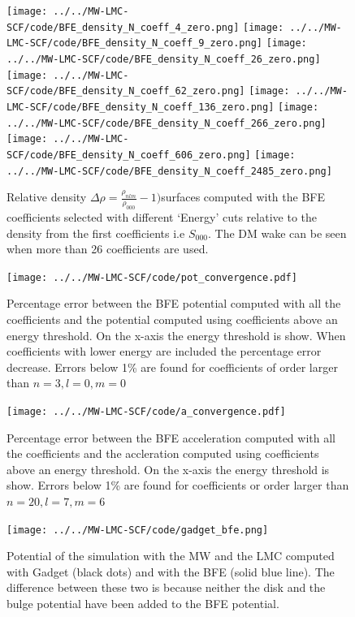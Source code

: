 \documentclass[14pt]{article}
\begin{document}
\begin{figure}[H]
  \centering
  \texttt{[image: ../../MW-LMC-SCF/code/BFE\_density\_N\_coeff\_4\_zero.png]}
  \texttt{[image: ../../MW-LMC-SCF/code/BFE\_density\_N\_coeff\_9\_zero.png]}
  \texttt{[image: ../../MW-LMC-SCF/code/BFE\_density\_N\_coeff\_26\_zero.png]}
  \texttt{[image: ../../MW-LMC-SCF/code/BFE\_density\_N\_coeff\_62\_zero.png]}
  \texttt{[image: ../../MW-LMC-SCF/code/BFE\_density\_N\_coeff\_136\_zero.png]}
  \texttt{[image: ../../MW-LMC-SCF/code/BFE\_density\_N\_coeff\_266\_zero.png]}
  \texttt{[image: ../../MW-LMC-SCF/code/BFE\_density\_N\_coeff\_606\_zero.png]}
  \texttt{[image: ../../MW-LMC-SCF/code/BFE\_density\_N\_coeff\_2485\_zero.png]}
  \caption{Relative density $\Delta \rho=\frac{\rho_{nlm}}{\rho_{000}}-1) $surfaces computed with the BFE coefficients selected with
  different `Energy' cuts relative to the density from the first coefficients
  i.e $S_{000}$. The DM wake can be seen when more than 26 coefficients are
  used.}
\end{figure}




\begin{figure}[H]
  \centering
  \texttt{[image: ../../MW-LMC-SCF/code/pot\_convergence.pdf]}
  \caption{Percentage error between the BFE potential computed with all the
  coefficients and the potential computed using coefficients above an energy
  threshold. On the x-axis the energy threshold is show. When coefficients with
  lower energy are included the percentage error decrease. Errors below 1\% are
  found for coefficients of order larger than $n=3, l=0, m=0$}
\end{figure}




\begin{figure}[H]
  \texttt{[image: ../../MW-LMC-SCF/code/a\_convergence.pdf]}
  \caption{Percentage error between the BFE acceleration computed with all the
  coefficients and the accleration computed using coefficients above an energy
  threshold. On the x-axis the energy threshold is show. Errors below 1\% are
  found for coefficients or order larger than $n=20, l=7, m=6$}
\end{figure}



\begin{figure}[H]
  \centering
  \texttt{[image: ../../MW-LMC-SCF/code/gadget\_bfe.png]}
  \caption{Potential of the simulation with the MW and the LMC computed with Gadget (black dots) and with the BFE (solid
  blue line). The difference between these two is because neither the disk
  and the bulge potential have been added to the BFE potential.}
\end{figure}
\end{document}
